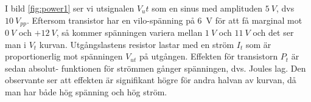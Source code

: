 I bild \ref{fig:power1} ser vi utsignalen \(V_ut\) som en sinus med amplituden
\(5\ V\), dvs \(10\ V_{pp}\). Eftersom transistor har en vilo-spänning på 6~V
för att få marginal mot \(0\ V\) och \(+12\ V\), så kommer spänningen variera
mellan \(1\ V\) och \(11\ V\) och det ser man i \(V_t\) kurvan. Utgångslastens
resistor lastar med en ström \(I_t\) som är proportionerlig mot spänningen
\(V_{ut}\) på utgången. Effekten för transistorn \(P_t\) är sedan absolut-
funktionen för strömmen gånger spänningen, dvs. Joules lag. Den observante ser
att effekten är signifikant högre för andra halvan av kurvan, då man har både
hög spänning och hög ström.
